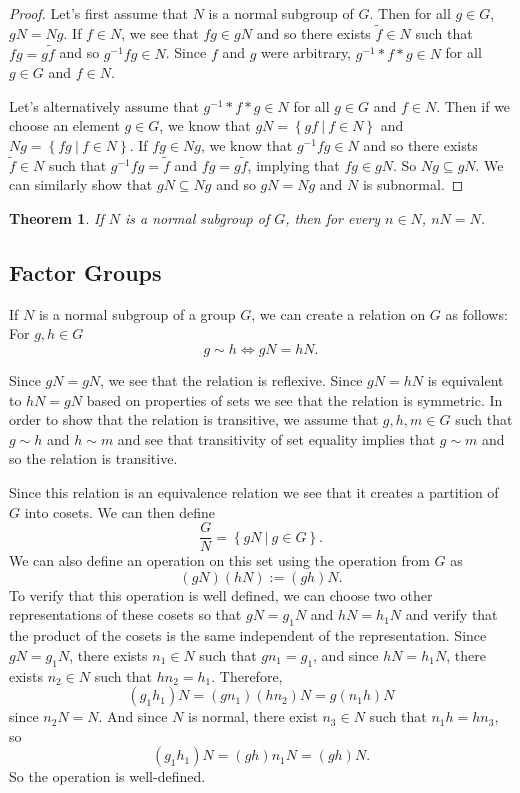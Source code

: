 \documentclass[
]{book}
\newtheorem{theorem}{Theorem}[chapter]
\theoremstyle{definition}
\theoremstyle{definition}
\theoremstyle{definition}
\theoremstyle{definition}
\theoremstyle{remark}
\begin{document}
\begin{proof}
Let's first assume that \(N\) is a normal subgroup of \(G\). Then for all \(g\in G\), \(gN=Ng\). If \(f\in N\), we see that \(fg\in gN\) and so there exists \(\tilde{f}\in N\) such that \(fg=g\tilde{f}\) and so \(g^{-1}fg \in N\). Since \(f\) and \(g\) were arbitrary, \(g^{-1}*f*g \in N\) for all \(g\in G\) and \(f\in N\).

Let's alternatively assume that \(g^{-1}*f*g \in N\) for all \(g\in G\) and \(f\in N\). Then if we choose an element \(g\in G\), we know that \(gN = \left\{ g f \: \vert \: f\in N\right\}\) and \(Ng=\left\{ fg \: \vert \: f\in N\right\}\). If \(fg\in Ng\), we know that \(g^{-1} fg \in N\) and so there exists \(\tilde{f}\in N\) such that \(g^{-1}fg=\tilde{f}\) and \(fg=g\tilde{f}\), implying that \(fg\in gN\). So \(Ng\subseteq gN\). We can similarly show that \(gN\subseteq Ng\) and so \(gN=Ng\) and \(N\) is subnormal.
\end{proof}

\begin{theorem}
If \(N\) is a normal subgroup of \(G\), then for every \(n\in N\), \(nN=N\).
\end{theorem}

\hypertarget{factor-groups}{%
\subsection{Factor Groups}\label{factor-groups}}

If \(N\) is a normal subgroup of a group \(G\), we can create a relation on \(G\) as follows: For \(g,h\in G\)
\[g \sim h \Leftrightarrow gN=hN.\]

Since \(gN=gN\), we see that the relation is reflexive. Since \(gN=hN\) is equivalent to \(hN=gN\) based on properties of sets we see that the relation is symmetric. In order to show that the relation is transitive, we assume that \(g,h,m\in G\) such that \(g \sim h\) and \(h\sim m\) and see that transitivity of set equality implies that \(g\sim m\) and so the relation is transitive.

Since this relation is an equivalence relation we see that it creates a partition of \(G\) into cosets. We can then define
\[\frac{G}{N} = \left\{ gN \: \vert \: g\in G\right\}.\]
We can also define an operation on this set using the operation from \(G\) as
\[(gN)(hN) := (gh)N.\] To verify that this operation is well defined, we can choose two other representations of these cosets so that \(gN=g_1 N\) and \(hN=h_1N\) and verify that the product of the cosets is the same independent of the representation. Since \(gN=g_1N\), there exists \(n_1\in N\) such that \(gn_1 =g_1\), and since \(hN=h_1N\), there exists \(n_2\in N\) such that \(hn_2=h_1\). Therefore,
\[(g_1 h_1)N= (g n_1)(h n_2) N = g (n_1 h)N\] since \(n_2N=N\). And since \(N\) is normal, there exist \(n_3\in N\) such that \(n_1 h= h n_3\), so
\[(g_1 h_1)N= (gh)n_1 N = (gh)N.\] So the operation is well-defined.
\end{document}
